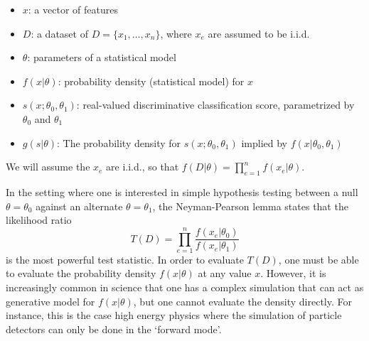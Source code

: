\documentclass[11pt, oneside]{article}   	%
\begin{document}
\begin{itemize}
 \item $x$: a vector of features
 \item $D$: a dataset of $D=\{x_1, \dots, x_n\}$, where $x_e$ are assumed to be i.i.d.
 \item $\theta$: parameters of a statistical model
\item $f(x| \theta)$:  probability density  (statistical model) for $x$ 
\item $s(x;\theta_0, \theta_1)$: real-valued discriminative classification score, parametrized by $\theta_0$ and $\theta_1$
\item $g( s | \theta )$: The probability density  for $s(x; \theta_0, \theta_1)$ implied by $f(x|\theta_0, \theta_1)$ \end{itemize}
We will assume the $x_e$ are i.i.d., so that $f(D|\theta) = \prod_{e=1}^n f(x_e | \theta)$.

In the setting where one is interested in simple hypothesis testing between a null $\theta=\theta_0$ against an alternate $\theta=\theta_1$, the Neyman-Pearson lemma states that the likelihood ratio 
\begin{equation}
T(D) = \prod_{e=1}^n \frac{ f(x_e|\theta_0)}{ f(x_e|\theta_1)}
\end{equation}
is the most powerful test statistic. In order to evaluate $T(D)$, one must be able to evaluate the probability density 
$f(x| \theta)$ at any value $x$. However, it is increasingly common in science that one has a complex simulation that 
can act as generative model  for $f(x|\theta)$, but one cannot evaluate the density directly. For instance, this is the case 
high energy physics where the simulation of particle detectors can only be done in the `forward mode'. 
\end{document}
